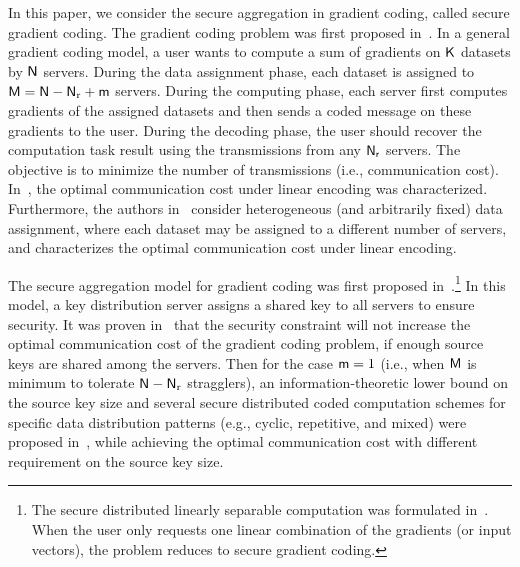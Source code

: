 \documentclass[conference,letterpaper]{IEEEtran}
\begin{document}
In this paper, we consider the secure aggregation in gradient coding, called secure gradient coding. 
The gradient coding problem was first proposed in~\cite{pmlr-v70-tandon17a}. 
In a general gradient coding model, a user wants to compute a sum of gradients on   ${\sf K}$ datasets by ${\sf N}$ servers. During the data assignment phase, each dataset is assigned to ${\sf M} = {\sf N} - {\sf N}_{\rm r} + {\sf m}$  servers.  During the computing phase, each server first computes gradients of the assigned datasets and then sends a coded message on these gradients to the user. During the decoding phase, the user should recover the computation task result using the transmissions from any ${\sf N_r}$ servers. The objective is to minimize the number of transmissions (i.e., communication cost). 
In~\cite{ye2018communication}, the optimal communication cost under linear encoding was characterized. 
Furthermore, the authors in~\cite{Heterogeneous_Gradient_Coding} consider heterogeneous (and arbitrarily fixed) data assignment, where each dataset may be assigned to a different number of servers,  and 
characterizes the optimal communication cost under linear encoding. 

The secure aggregation model for gradient coding was first proposed in~\cite{wan2022secure}.\footnote{\label{foot:linearly separable}The secure distributed linearly separable computation was formulated in~\cite{wan2022secure}. When the user only requests one linear combination of the gradients (or input vectors),  the problem reduces to secure gradient coding.} %
In this model, a key distribution server assigns a shared key to all servers to ensure security.
It was proven in~\cite{wan2022secure} that the security constraint will not increase the optimal
communication cost of the gradient coding problem, if enough
source keys are shared among the servers. Then 
for the case  ${\sf m}=1$ (i.e., when ${\sf M}$ is minimum to tolerate ${\sf N}-{\sf N}_{\rm r}$ stragglers), an information-theoretic lower bound on the source key size and several secure distributed coded computation schemes for specific data distribution patterns (e.g., cyclic, repetitive, and mixed) were proposed in~\cite{wan2022secure},  while achieving the optimal communication cost with different requirement on the source key size. 
\end{document}
